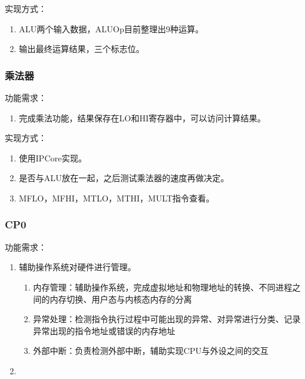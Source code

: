             实现方式：
            \begin{enumerate}
            \item
            ALU两个输入数据，ALUOp目前整理出9种运算。
            \item
            输出最终运算结果，三个标志位。
            \end{enumerate}

        \subsubsection{乘法器}
            功能需求：
            \begin{enumerate}
            \item
            完成乘法功能，结果保存在LO和HI寄存器中，可以访问计算结果。
            \end{enumerate}

            实现方式：
            \begin{enumerate}
                \item
            使用IPCore实现。
            \item
            是否与ALU放在一起，之后测试乘法器的速度再做决定。
            \item
            MFLO，MFHI，MTLO，MTHI，MULT指令查看。
            \end{enumerate}

        \subsubsection{CP0}
            功能需求：
            \begin{enumerate}
            \item
                辅助操作系统对硬件进行管理。
                \begin{enumerate}
                \item
                    内存管理：辅助操作系统，完成虚拟地址和物理地址的转换、不同进程之间的内存切换、用户态与内核态内存的分离
                \item
                    异常处理：检测指令执行过程中可能出现的异常、对异常进行分类、记录异常出现的指令地址或错误的内存地址
                \item
                    外部中断：负责检测外部中断，辅助实现CPU与外设之间的交互
                \end{enumerate}
            \item

            \end{enumerate}

